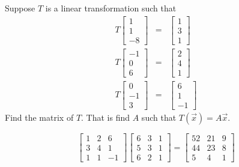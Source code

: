 \documentclass{ximera}
\begin{document}
\begin{problem}\label{prb:10.94} Suppose $T$ is a linear transformation such that
\begin{eqnarray*}
T\left[
\begin{array}{r}
1 \\
1 \\
-8
\end{array}
\right] &=&\left[
\begin{array}{r}
1 \\
3 \\
1
\end{array}
\right] \\
T\left[
\begin{array}{r}
-1 \\
0 \\
6
\end{array}
\right] &=&\left[
\begin{array}{r}
2 \\
4 \\
1
\end{array}
\right] \\
T\left[
\begin{array}{r}
0 \\
-1 \\
3
\end{array}
\right] &=&\left[
\begin{array}{r}
6 \\
1 \\
-1
\end{array}
\right]
\end{eqnarray*}
Find the matrix of $T$. That is find $A$ such that $T(\vec{x})=A\vec{x}$. \vspace{1mm}
\begin{hint}
\[
\left[
\begin{array}{rrr}
1 & 2 & 6 \\
3 & 4 & 1 \\
1 & 1 & -1
\end{array}
\right] \left[
\begin{array}{ccc}
6 & 3 & 1 \\
5 & 3 & 1 \\
6 & 2 & 1
\end{array}
\right] =\left[
\begin{array}{ccc}
52 & 21 & 9 \\
44 & 23 & 8 \\
5 & 4 & 1
\end{array}
\right]
\]
\end{hint}
\end{problem}
\end{document}
